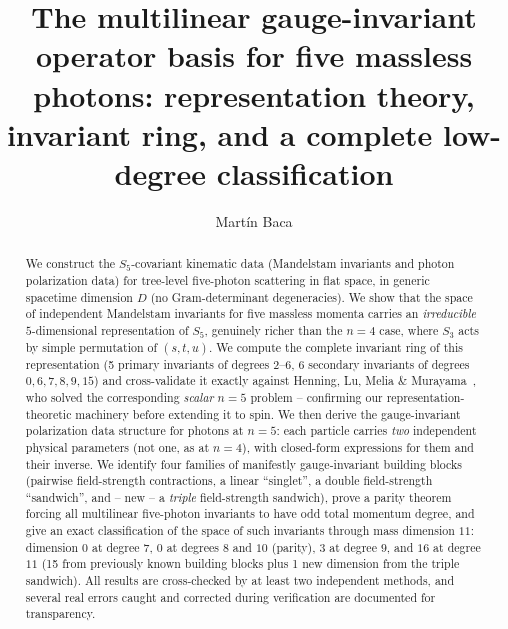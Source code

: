 \documentclass[reqno]{amsart}
\title[The gauge-invariant operator basis for five photons]{The multilinear gauge-invariant
operator basis for five massless photons: representation theory, invariant ring, and a complete
low-degree classification}
\author{Mart\'in Baca}
\date{}
\begin{document}
\begin{center}
\end{center}

\begin{abstract}
We construct the $S_5$-covariant kinematic data (Mandelstam invariants and photon polarization
data) for tree-level five-photon scattering in flat space, in generic spacetime dimension $D$
(no Gram-determinant degeneracies). We show that the space of independent Mandelstam invariants
for five massless momenta carries an \emph{irreducible} $5$-dimensional representation of $S_5$,
genuinely richer than the $n=4$ case, where $S_3$ acts by simple permutation of $(s,t,u)$. We
compute the complete invariant ring of this representation (5 primary invariants of degrees
$2$--$6$, 6 secondary invariants of degrees $0,6,7,8,9,15$) and cross-validate it exactly against
Henning, Lu, Melia \& Murayama~\cite{hlmm2017}, who solved the corresponding \emph{scalar} $n=5$
problem -- confirming our representation-theoretic machinery before extending it to spin. We then
derive the gauge-invariant polarization data structure for photons at $n=5$: each particle carries
\emph{two} independent physical parameters (not one, as at $n=4$), with closed-form expressions
for them and their inverse. We identify four families of manifestly gauge-invariant building
blocks (pairwise field-strength contractions, a linear ``singlet'', a double field-strength
``sandwich'', and -- new -- a \emph{triple} field-strength sandwich), prove a parity theorem
forcing all multilinear five-photon invariants to have odd total momentum degree, and give an
exact classification of the space of such invariants through mass dimension $11$: dimension $0$ at
degree $7$, $0$ at degrees $8$ and $10$ (parity), $3$ at degree $9$, and $16$ at degree $11$
(15 from previously known building blocks plus 1 new dimension from the triple sandwich). All
results are cross-checked by at least two independent methods, and several real errors caught and
corrected during verification are documented for transparency.
\end{abstract}
\end{document}
